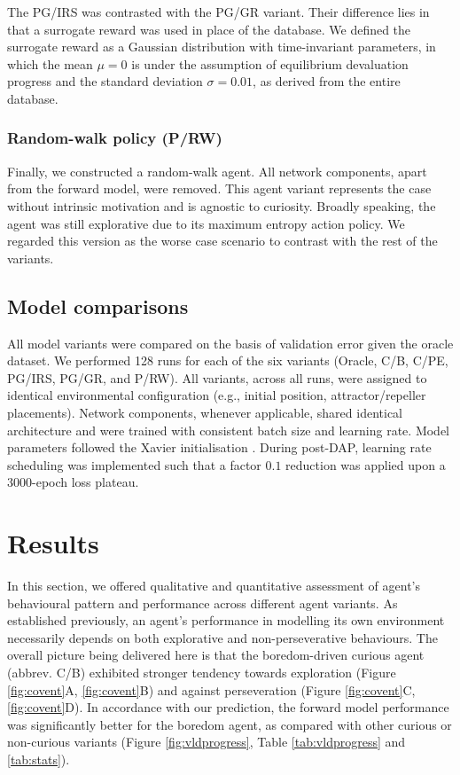 \documentclass[utf8]{frontiersSCNS}
\begin{document}
The PG/IRS was contrasted with the PG/GR variant. Their difference lies in that a surrogate reward was used in place of the database. We defined the surrogate reward as a Gaussian distribution with time-invariant parameters, in which the mean $\mu=0$ is under the assumption of equilibrium devaluation progress and the standard deviation $\sigma=0.01$, as derived from the entire database.

\subsubsection{Random-walk policy (P/RW)}

Finally, we constructed a random-walk agent. All network components, apart from the forward model, were removed. This agent variant represents the case without intrinsic motivation and is agnostic to curiosity. Broadly speaking, the agent was still explorative due to its maximum entropy action policy. We regarded this version as the worse case scenario to contrast with the rest of the variants.


\subsection{Model comparisons} \label{subsec:modcompare}

All model variants were compared on the basis of validation error given the oracle dataset. We performed 128 runs for each of the six variants (Oracle, C/B, C/PE, PG/IRS, PG/GR, and P/RW). All variants, across all runs, were assigned to identical environmental configuration (e.g., initial position, attractor/repeller placements). Network components, whenever applicable, shared identical architecture and were trained with consistent batch size and learning rate. Model parameters followed the Xavier initialisation \citep{glorot}. During post-DAP, learning rate scheduling was implemented such that a factor $0.1$ reduction was applied upon a 3000-epoch loss plateau.

\section{Results} \label{sec:results}

In this section, we offered qualitative and quantitative assessment of agent's behavioural pattern and performance across different agent variants. As established previously, an agent's performance in modelling its own environment necessarily depends on  both explorative and non-perseverative behaviours. The overall picture being delivered here is that the boredom-driven curious agent (abbrev. C/B) exhibited stronger tendency towards exploration (Figure \ref{fig:covent}A, \ref{fig:covent}B) and against perseveration (Figure \ref{fig:covent}C, \ref{fig:covent}D). In accordance with our prediction, the forward model performance was significantly better for the boredom agent, as compared with other curious or non-curious variants (Figure \ref{fig:vldprogress}, Table \ref{tab:vldprogress} and \ref{tab:stats}).
\end{document}
